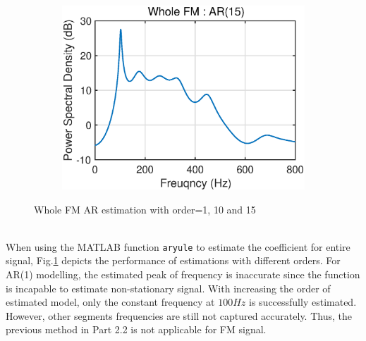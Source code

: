 \begin{figure}[htb]
     \begin{subfigure}[b]{0.33\textwidth}
         \centering
         \includegraphics[width=\textwidth]{fig/32/32a4.eps}
     \end{subfigure}
    \caption{Whole FM AR estimation with order=1, 10 and 15}
    \label{fig:3_2_a2}
\end{figure}\\
When using the MATLAB function \texttt{aryule} to estimate the coefficient for entire signal, Fig.\ref{fig:3_2_a2} depicts the performance of estimations with different orders. For AR(1) modelling, the estimated peak of frequency is inaccurate since the function is incapable to estimate non-stationary signal. With increasing the order of estimated model, only the constant frequency at $100Hz$ is successfully estimated. However, other segments frequencies are still not captured accurately. Thus, the previous method in Part 2.2 is not applicable for FM signal.
